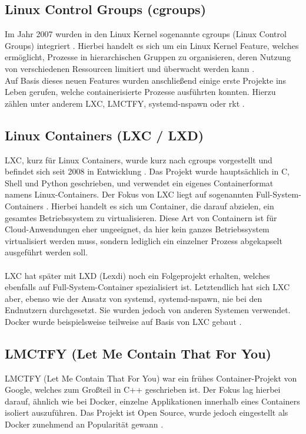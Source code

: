 \subsection{Linux Control Groups (cgroups)}
Im Jahr 2007 wurden in den Linux Kernel sogenannte cgroups (Linux Control Groups) integriert \cite{evan_baker_comprehensive_2021}. Hierbei handelt es sich um ein Linux Kernel Feature, welches ermöglicht, Prozesse in hierarchischen Gruppen zu organisieren, deren Nutzung von verschiedenen Ressourcen limitiert und überwacht werden kann \cite{noauthor_cgroups_2021}.\\
Auf Basis dieses neuen Features wurden anschließend einige erste Projekte ins Leben gerufen, welche containerisierte Prozesse ausführten konnten. Hierzu zählen unter anderem LXC, LMCTFY, systemd-nspawn oder rkt \cite{evan_baker_comprehensive_2021}.

\subsection{Linux Containers (LXC / LXD)}
LXC, kurz für Linux Containers, wurde kurz nach cgroups vorgestellt und befindet sich seit 2008 in Entwicklung \cite{noauthor_lxc_2021}. Das Projekt wurde hauptsächlich in C, Shell und Python geschrieben, und verwendet ein eigenes Containerformat namens Linux-Containers. Der Fokus von LXC liegt auf sogenannten Full-System-Containers \cite{noauthor_lxc_2021}. Hierbei handelt es sich um Container, die darauf abzielen, ein gesamtes Betriebssystem zu virtualisieren. Diese Art von Containern ist für Cloud-Anwendungen eher ungeeignet, da hier kein ganzes Betriebssystem virtualisiert werden muss, sondern lediglich ein einzelner Prozess abgekapselt ausgeführt werden soll.\\\\
LXC hat später mit LXD (Lexdi) noch ein Folgeprojekt erhalten, welches ebenfalls auf Full-System-Container spezialisiert ist. Letztendlich hat sich LXC aber, ebenso wie der Ansatz von systemd, systemd-nspawn, nie bei den Endnutzern durchgesetzt. Sie wurden jedoch von anderen Systemen verwendet. Docker wurde beispielsweise teilweise auf Basis von LXC gebaut \cite{evan_baker_comprehensive_2021}.

\subsection{LMCTFY (Let Me Contain That For You)}
LMCTFY (Let Me Contain That For You) war ein frühes Container-Projekt von Google, welches zum Großteil in C++ geschrieben ist. Der Fokus lag hierbei darauf, ähnlich wie bei Docker, einzelne Applikationen innerhalb eines Containers isoliert auszuführen. Das Projekt ist Open Source, wurde jedoch eingestellt als Docker zunehmend an Popularität gewann \cite{noauthor_lmctfy_2021}.

